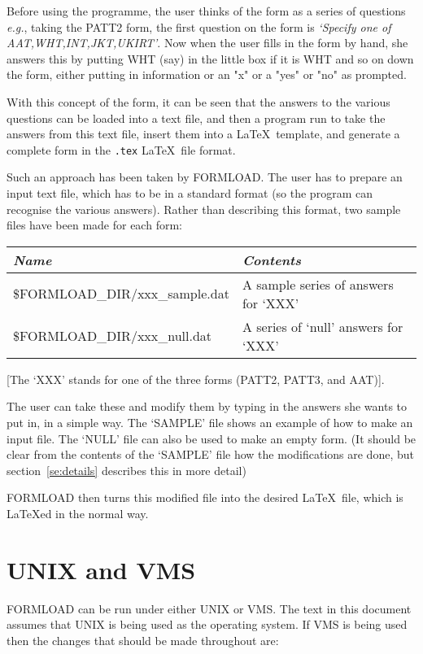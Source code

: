 Before using the programme, the user thinks of the form as a series of
questions {\em e.g.}, taking the PATT2 form, the first question on the form
is {\it `Specify one of AAT,WHT,INT,JKT,UKIRT'\/}.  Now when the user
fills in the form by hand, she answers this by putting WHT (say) in the
little box if it is WHT and so on down the form, either putting in
information or an "x" or a "yes" or "no" as prompted.

With this concept of the form, it can be seen that the answers to the
various questions can be loaded into a text file, and then a program run to
take the answers from this text file, insert them into a \LaTeX\ template,
and generate a complete form in the {\tt .tex} \LaTeX\ file
format.

Such an approach has been taken by FORMLOAD. The user has to prepare an
input text file, which has to be in a standard format (so the program can
recognise the various answers). Rather than describing this format, two
sample files have been made for each form:

\begin{center}
\begin{tabular}{|l|l|}\hline
{\it Name}        & {\it Contents}    \\ \hline \hline
\$FORMLOAD\_DIR/xxx\_sample.dat & A sample series of answers for `XXX' \\ \hline
\$FORMLOAD\_DIR/xxx\_null.dat   & A series of `null' answers for `XXX' \\ \hline
\end{tabular}
\end{center}

[The `XXX' stands for one of the three forms (PATT2, PATT3, and AAT)].

The user can take these and modify them by typing in the answers she wants
to put in, in a simple way. The `SAMPLE' file shows an example of how to
make an input file. The `NULL' file can also be used to make an empty form.
(It should be clear from the contents of the `SAMPLE' file how the
modifications are done, but section~\ref{se:details} describes this in more
detail)

FORMLOAD then turns this modified file into the desired \LaTeX\ file,
which is \LaTeX ed in the normal way.

\section{UNIX and VMS}

FORMLOAD can be run under either UNIX or VMS. The text in this document
assumes that UNIX is being used as the operating system. If VMS is being
used then the changes that should be made throughout are:

